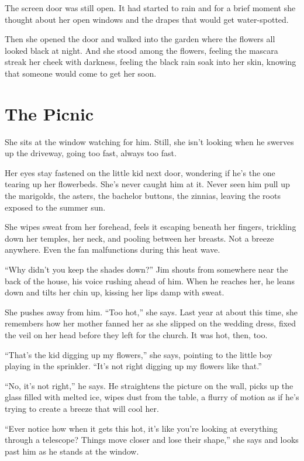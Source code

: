 \documentclass[twoside,10pt]{book}
\begin{document}
The screen door was still open. It had started to rain and for a brief
moment she thought about her open windows and the drapes that would get
water-spotted.

Then she opened the door and walked into the garden where the flowers
all looked black at night. And she stood among the flowers, feeling the
mascara streak her cheek with darkness, feeling the black rain soak into
her skin, knowing that someone would come to get her soon.



\cleardoublepage
\chapter{The Picnic}

She sits at the window watching for him. Still, she isn't looking when
he swerves up the drive­way, going too fast, always too fast.

Her eyes stay fastened on the little kid next door, wondering if he's
the one tearing up her flowerbeds. She's never caught him at it. Never
seen him pull up the marigolds, the asters, the bache­lor buttons, the
zinnias, leaving the roots exposed to the summer sun.

She wipes sweat from her forehead, feels it escaping beneath her
fingers, trickling down her temples, her neck, and pooling between her
breasts. Not a breeze anywhere. Even the fan malfunc­tions during this
heat wave.

``Why didn't you keep the shades down?'' Jim shouts from somewhere near
the back of the house, his voice rushing ahead of him. When he reaches
her, he leans down and tilts her chin up, kiss­ing her lips damp with
sweat.

She pushes away from him. ``Too hot,'' she says. Last year at about this
time, she remembers how her mother fanned her as she slipped on the
wedding dress, fixed the veil on her head before they left for the
church. It was hot, then, too.

``That's the kid digging up my flowers,'' she says, pointing to the
little boy playing in the sprin­kler. ``It's not right digging up my
flowers like that.''

``No, it's not right,'' he says. He straightens the picture on the wall,
picks up the glass filled with melted ice, wipes dust from the table, a
flurry of motion as if he's trying to create a breeze that will cool
her.

``Ever notice how when it gets this hot, it's like you're looking at
everything through a telescope? Things move closer and lose their
shape,'' she says and looks past him as he stands at the window.
\end{document}
